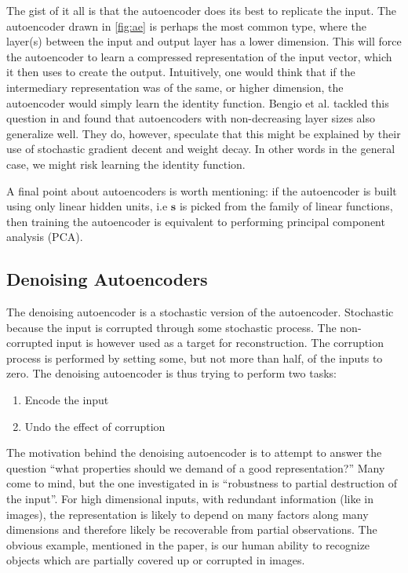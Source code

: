 \documentclass[11pt]{article}
\begin{document}
The gist of it all is that the autoencoder does its best to replicate the input.  The autoencoder drawn in \ref{fig:ae} is perhaps the most common type, where the layer(s) between the input and output layer has a lower dimension.  This will force the autoencoder to learn a compressed representation of the input vector, which it then uses to create the output.  Intuitively, one would think that if the intermediary representation was of the same, or higher dimension, the autoencoder would simply learn the identity function.  Bengio et al. tackled this question in \cite{bengio07} and found that autoencoders with non-decreasing layer sizes also generalize well.  They do, however, speculate that this might be explained by their use of stochastic gradient decent and weight decay.  In other words in the general case, we might risk learning the identity function.

A final point about autoencoders is worth mentioning: if the autoencoder is built using only linear hidden units, i.e $\mathbf{s}$ is picked from the family of linear functions, then training the autoencoder is equivalent to performing principal component analysis (PCA).

\subsection{Denoising Autoencoders}

The denoising autoencoder is a stochastic version of the autoencoder.  Stochastic because the input is corrupted through some stochastic process.  The non-corrupted input is however used as a target for reconstruction.  The corruption process is performed by setting some, but not more than half, of the inputs to zero.  The denoising autoencoder is thus trying to perform two tasks:
\begin{enumerate}
\item Encode the input
\item Undo the effect of corruption
\end{enumerate}

The motivation behind the denoising autoencoder is to attempt to answer the question ``what properties should we demand of a good representation?''  Many come to mind, but the one investigated in \cite{bengio07} is ``robustness to partial destruction of the input''.  For high dimensional inputs, with redundant information (like in images), the representation is likely to depend on many factors along many dimensions and therefore likely be recoverable from partial observations.  The obvious example, mentioned in the paper, is our human ability to recognize objects which are partially covered up or corrupted in images.
\end{document}
